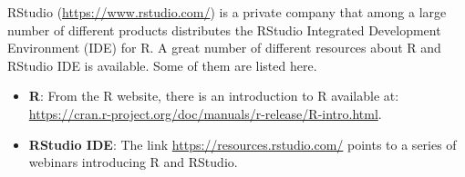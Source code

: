 \documentclass[
]{book}
\providecommand{\tightlist}{%
  \setlength{\itemsep}{0pt}\setlength{\parskip}{0pt}}
\theoremstyle{definition}
\theoremstyle{definition}
\theoremstyle{definition}
\theoremstyle{remark}
\begin{document}
RStudio (\url{https://www.rstudio.com/}) is a private company that among a large number of different products distributes the RStudio Integrated Development Environment (IDE) for R. A great number of different resources about R and RStudio IDE is available. Some of them are listed here.

\begin{itemize}
\tightlist
\item
  \textbf{R}: From the R website, there is an introduction to R available at: \url{https://cran.r-project.org/doc/manuals/r-release/R-intro.html}.
\item
  \textbf{RStudio IDE}: The link \url{https://resources.rstudio.com/} points to a series of webinars introducing R and RStudio.
\end{itemize}

  
\end{document}
